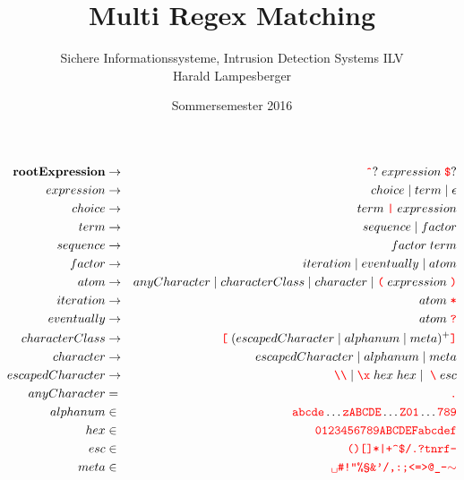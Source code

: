 \documentclass[a4paper, 12pt]{article}
\title{Multi Regex Matching}
\author{Sichere Informationssysteme, Intrusion Detection Systems ILV\\
\normalsize Harald Lampesberger}
\date{\normalsize Sommersemester 2016}
\theoremstyle{mystyle}
\begin{document}




\begin{eqnarray}
\mathbf{rootExpression} & \to & \text{\color{red}\texttt{\^}}? \; expression \; \text{\color{red}\texttt{\$}}? \\
expression & \to & choice \mid term \mid \epsilon \\
choice & \to & term \; \text{\color{red}\texttt{|}} \; expression \\
term & \to & sequence \mid factor \\
sequence & \to & factor \; term \\
factor & \to & iteration \mid eventually \mid atom \\
atom & \to & anyCharacter \mid characterClass \mid character \mid \text{\color{red}\texttt{(}} \; expression \; \text{\color{red}\texttt{)}} \\
iteration & \to & atom \; \text{\color{red}\texttt{*}} \\
eventually & \to & atom \; \text{\color{red}\texttt{?}} \\
characterClass & \to & \text{\color{red}\texttt{[}} \; (escapedCharacter \mid alphanum \mid meta)^+ \text{\color{red}\texttt{]}} \\
character & \to & escapedCharacter \mid alphanum \mid meta \\
escapedCharacter & \to & \text{\color{red}\texttt{\textbackslash\textbackslash}} \mid \text{\color{red}\texttt{\textbackslash x}} \; hex \; hex \mid  \; \text{\color{red}\texttt{\textbackslash}} \; esc \\
anyCharacter & = & \text{\color{red}\texttt{.}} \\
alphanum & \in & \text{\color{red}\texttt{abcde}} \dots \text{\color{red}\texttt{zABCDE}} \dots \text{\color{red}\texttt{Z01}} \dots \text{\color{red}\texttt{789}} \\
hex & \in & \text{\color{red}\texttt{0123456789ABCDEFabcdef}} \\
esc & \in & \text{\color{red}\texttt{(){}[]*|+\textasciicircum \$/.?tnrf-}} \\
meta & \in & \text{\color{red}\texttt{\textvisiblespace \#!"\%§\&'/,:;<=>@\_-}$\sim$}
\end{eqnarray}
\end{document}
